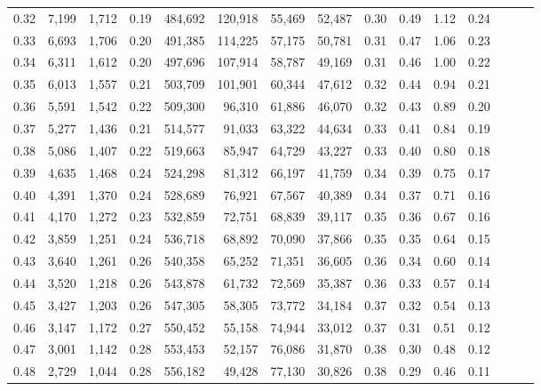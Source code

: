 \begin{tabular}{rrrrrrrrrrrrrrr}
0.32 &   7,199 &  1,712 &  0.19 &  484,692 &  120,918 &   55,469 &   52,487 &  0.30 &  0.49 &  1.12 &      0.24 \\
0.33 &   6,693 &  1,706 &  0.20 &  491,385 &  114,225 &   57,175 &   50,781 &  0.31 &  0.47 &  1.06 &      0.23 \\
0.34 &   6,311 &  1,612 &  0.20 &  497,696 &  107,914 &   58,787 &   49,169 &  0.31 &  0.46 &  1.00 &      0.22 \\
0.35 &   6,013 &  1,557 &  0.21 &  503,709 &  101,901 &   60,344 &   47,612 &  0.32 &  0.44 &  0.94 &      0.21 \\
0.36 &   5,591 &  1,542 &  0.22 &  509,300 &   96,310 &   61,886 &   46,070 &  0.32 &  0.43 &  0.89 &      0.20 \\
0.37 &   5,277 &  1,436 &  0.21 &  514,577 &   91,033 &   63,322 &   44,634 &  0.33 &  0.41 &  0.84 &      0.19 \\
0.38 &   5,086 &  1,407 &  0.22 &  519,663 &   85,947 &   64,729 &   43,227 &  0.33 &  0.40 &  0.80 &      0.18 \\
0.39 &   4,635 &  1,468 &  0.24 &  524,298 &   81,312 &   66,197 &   41,759 &  0.34 &  0.39 &  0.75 &      0.17 \\
0.40 &   4,391 &  1,370 &  0.24 &  528,689 &   76,921 &   67,567 &   40,389 &  0.34 &  0.37 &  0.71 &      0.16 \\
0.41 &   4,170 &  1,272 &  0.23 &  532,859 &   72,751 &   68,839 &   39,117 &  0.35 &  0.36 &  0.67 &      0.16 \\
0.42 &   3,859 &  1,251 &  0.24 &  536,718 &   68,892 &   70,090 &   37,866 &  0.35 &  0.35 &  0.64 &      0.15 \\
0.43 &   3,640 &  1,261 &  0.26 &  540,358 &   65,252 &   71,351 &   36,605 &  0.36 &  0.34 &  0.60 &      0.14 \\
0.44 &   3,520 &  1,218 &  0.26 &  543,878 &   61,732 &   72,569 &   35,387 &  0.36 &  0.33 &  0.57 &      0.14 \\
0.45 &   3,427 &  1,203 &  0.26 &  547,305 &   58,305 &   73,772 &   34,184 &  0.37 &  0.32 &  0.54 &      0.13 \\
0.46 &   3,147 &  1,172 &  0.27 &  550,452 &   55,158 &   74,944 &   33,012 &  0.37 &  0.31 &  0.51 &      0.12 \\
0.47 &   3,001 &  1,142 &  0.28 &  553,453 &   52,157 &   76,086 &   31,870 &  0.38 &  0.30 &  0.48 &      0.12 \\
0.48 &   2,729 &  1,044 &  0.28 &  556,182 &   49,428 &   77,130 &   30,826 &  0.38 &  0.29 &  0.46 &      0.11 \\

\end{tabular}
